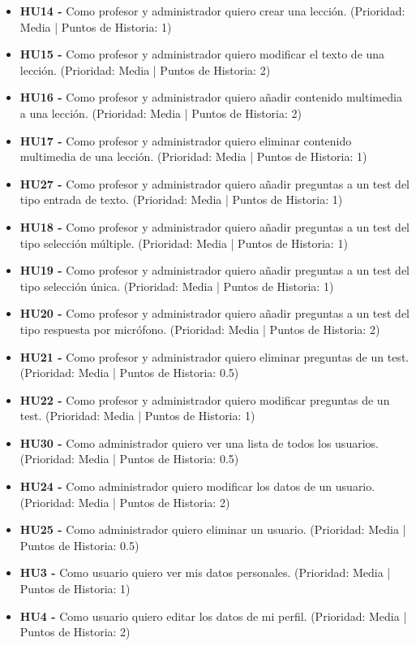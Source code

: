 \begin{itemize}
    \item \textbf{HU14 - } Como profesor y administrador quiero crear una lección. (Prioridad: Media | Puntos de Historia: 1)
    \item \textbf{HU15 - } Como profesor y administrador quiero modificar el texto de una lección. (Prioridad: Media | Puntos de Historia: 2)
    \item \textbf{HU16 - } Como profesor y administrador quiero añadir contenido multimedia a una lección. (Prioridad: Media | Puntos de Historia: 2)
    \item \textbf{HU17 - } Como profesor y administrador quiero eliminar contenido multimedia de una lección. (Prioridad: Media | Puntos de Historia: 1)
    \item \textbf{HU27 - } Como profesor y administrador quiero añadir preguntas a un test del tipo entrada de texto. (Prioridad: Media | Puntos de Historia: 1)
    \item \textbf{HU18 - } Como profesor y administrador quiero añadir preguntas a un test del tipo selección múltiple. (Prioridad: Media | Puntos de Historia: 1)
    \item \textbf{HU19 - } Como profesor y administrador quiero añadir preguntas a un test del tipo selección única. (Prioridad: Media | Puntos de Historia: 1)
    \item \textbf{HU20 - } Como profesor y administrador quiero añadir preguntas a un test del tipo respuesta por micrófono. (Prioridad: Media | Puntos de Historia: 2)
    \item \textbf{HU21 - } Como profesor y administrador quiero eliminar preguntas de un test. (Prioridad: Media | Puntos de Historia: 0.5)
    \item \textbf{HU22 - } Como profesor y administrador quiero modificar preguntas de un test. (Prioridad: Media | Puntos de Historia: 1)
    \item \textbf{HU30 - } Como administrador quiero ver una lista de todos los usuarios. (Prioridad: Media | Puntos de Historia: 0.5)
    \item \textbf{HU24 - } Como administrador quiero modificar los datos de un usuario. (Prioridad: Media | Puntos de Historia: 2)
    \item \textbf{HU25 - } Como administrador quiero eliminar un usuario. (Prioridad: Media | Puntos de Historia: 0.5)
    \item \textbf{HU3 - } Como usuario quiero ver mis datos personales. (Prioridad: Media | Puntos de Historia: 1)
    \item \textbf{HU4 - } Como usuario quiero editar los datos de mi perfil. (Prioridad: Media | Puntos de Historia: 2)

\end{itemize}
